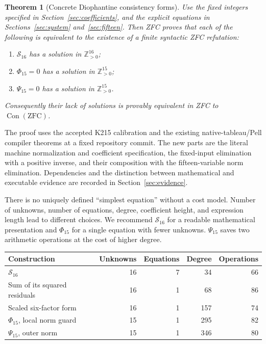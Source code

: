 \documentclass[11pt]{article}
\newcommand{\Pos}{\mathbb Z_{>0}}
\newcommand{\Con}{\operatorname{Con}}
\newtheorem{theorem}{Theorem}[section]
\theoremstyle{remark}\newtheorem{remark}[theorem]{Remark}
\begin{document}
\begin{theorem}[Concrete Diophantine consistency forms]\label{thm:main}
Use the fixed integers specified in Section~\ref{sec:coefficients}, and the explicit equations in Sections~\ref{sec:system} and~\ref{sec:fifteen}. Then ZFC proves that each of the following is equivalent to the existence of a finite syntactic ZFC refutation:
\begin{enumerate}[label=(\roman*),nosep]
\item $\mathcal S_{16}$ has a solution in $\Pos^{16}$;
\item $\Phi_{15}=0$ has a solution in $\Pos^{15}$;
\item $\Psi_{15}=0$ has a solution in $\Pos^{15}$.
\end{enumerate}
Consequently their lack of solutions is provably equivalent in ZFC to $\Con(\mathrm{ZFC})$.
\end{theorem}

The proof uses the accepted K215 calibration and the existing native-tableau/Pell compiler theorems at a fixed repository commit. The new parts are the literal machine normalization and coefficient specification, the fixed-input elimination with a positive inverse, and their composition with the fifteen-variable norm elimination. Dependencies and the distinction between mathematical and executable evidence are recorded in Section~\ref{sec:evidence}.

There is no uniquely defined ``simplest equation'' without a cost model. Number of unknowns, number of equations, degree, coefficient height, and expression length lead to different choices. We recommend $\mathcal S_{16}$ for a readable mathematical presentation and $\Phi_{15}$ for a single equation with fewer unknowns. $\Psi_{15}$ saves two arithmetic operations at the cost of higher degree.

\begin{center}
\begin{tabular}{lrrrr}
\toprule
Construction & Unknowns & Equations & Degree & Operations\\
\midrule
$\mathcal S_{16}$ &16&7&34&66\\
Sum of its squared residuals &16&1&68&86\\
Scaled six-factor form &16&1&157&74\\
$\Phi_{15}$, local norm guard &15&1&295&82\\
$\Psi_{15}$, outer norm &15&1&346&80\\
\bottomrule
\end{tabular}
\end{center}
\end{document}
